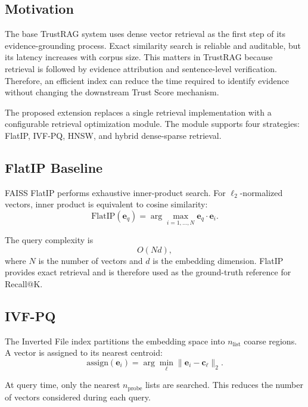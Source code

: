 \documentclass[conference]{IEEEtran}
\begin{document}
\subsection{Motivation}

The base TrustRAG system uses dense vector retrieval as the first step of its evidence-grounding process. Exact similarity search is reliable and auditable, but its latency increases with corpus size. This matters in TrustRAG because retrieval is followed by evidence attribution and sentence-level verification. Therefore, an efficient index can reduce the time required to identify evidence without changing the downstream Trust Score mechanism.

The proposed extension replaces a single retrieval implementation with a configurable retrieval optimization module. The module supports four strategies: FlatIP, IVF-PQ, HNSW, and hybrid dense-sparse retrieval.

\subsection{FlatIP Baseline}

FAISS FlatIP performs exhaustive inner-product search. For $\ell_2$-normalized vectors, inner product is equivalent to cosine similarity:
\begin{equation}
\mathrm{FlatIP}(\mathbf{e}_q)
=\arg\max_{i=1,\ldots,N}
\mathbf{e}_q\cdot\mathbf{e}_i.
\end{equation}

The query complexity is
\begin{equation}
O(Nd),
\end{equation}
where $N$ is the number of vectors and $d$ is the embedding dimension. FlatIP provides exact retrieval and is therefore used as the ground-truth reference for Recall@K.

\subsection{IVF-PQ}

The Inverted File index partitions the embedding space into $n_{\mathrm{list}}$ coarse regions. A vector is assigned to its nearest centroid:
\begin{equation}
\mathrm{assign}(\mathbf{e}_i)
=\arg\min_{\ell}
\|\mathbf{e}_i-\mathbf{c}_{\ell}\|_2.
\end{equation}

At query time, only the nearest $n_{\mathrm{probe}}$ lists are searched. This reduces the number of vectors considered during each query.
\end{document}
